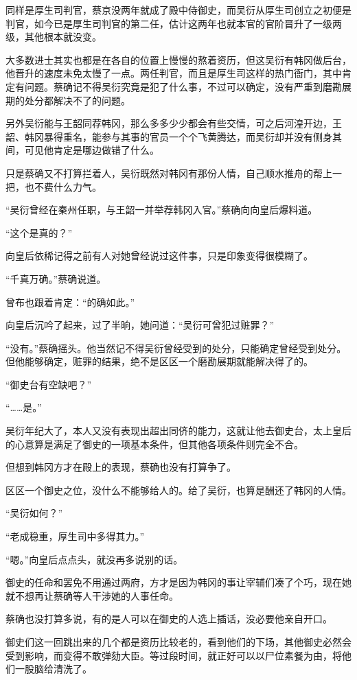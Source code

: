 同样是厚生司判官，蔡京没两年就成了殿中侍御史，而吴衍从厚生司创立之初便是判官，如今已是厚生司判官的第二任，估计这两年也就本官的官阶晋升了一级两级，其他根本就没变。

大多数进士其实也都是在各自的位置上慢慢的熬着资历，但这吴衍有韩冈做后台，他晋升的速度未免太慢了一点。两任判官，而且是厚生司这样的热门衙门，其中肯定有问题。蔡确记不得吴衍究竟是犯了什么事，不过可以确定，没有严重到磨勘展期的处分都解决不了的问题。

另外吴衍能与王韶同荐韩冈，那么多多少少都会有些交情，可之后河湟开边，王韶、韩冈暴得重名，能参与其事的官员一个个飞黄腾达，而吴衍却并没有侧身其间，可见他肯定是哪边做错了什么。

只是蔡确又不打算拦着人，吴衍既然对韩冈有那份人情，自己顺水推舟的帮上一把，也不费什么力气。

“吴衍曾经在秦州任职，与王韶一并举荐韩冈入官。”蔡确向向皇后爆料道。

“这个是真的？”

向皇后依稀记得之前有人对她曾经说过这件事，只是印象变得很模糊了。

“千真万确。”蔡确说道。

曾布也跟着肯定：“的确如此。”

向皇后沉吟了起来，过了半晌，她问道：“吴衍可曾犯过赃罪？”

“没有。”蔡确摇头。他当然记不得吴衍曾经受到的处分，只能确定曾经受到处分。但他能够确定，赃罪的结果，绝不是区区一个磨勘展期就能解决得了的。

“御史台有空缺吧？”

“……是。”

吴衍年纪大了，本人又没有表现出超出同侪的能力，这就让他去御史台，太上皇后的心意算是满足了御史的一项基本条件，但其他各项条件则完全不合。

但想到韩冈方才在殿上的表现，蔡确也没有打算争了。

区区一个御史之位，没什么不能够给人的。给了吴衍，也算是酬还了韩冈的人情。

“吴衍如何？”

“老成稳重，厚生司中多得其力。”

“嗯。”向皇后点点头，就没再多说别的话。

御史的任命和罢免不用通过两府，方才是因为韩冈的事让宰辅们凑了个巧，现在她就不想再让蔡确等人干涉她的人事任命。

蔡确也没打算多说，有的是人可以在御史的人选上插话，没必要他亲自开口。

御史们这一回跳出来的几个都是资历比较老的，看到他们的下场，其他御史必然会受到影响，而变得不敢弹劾大臣。等过段时间，就正好可以以尸位素餐为由，将他们一股脑给清洗了。

